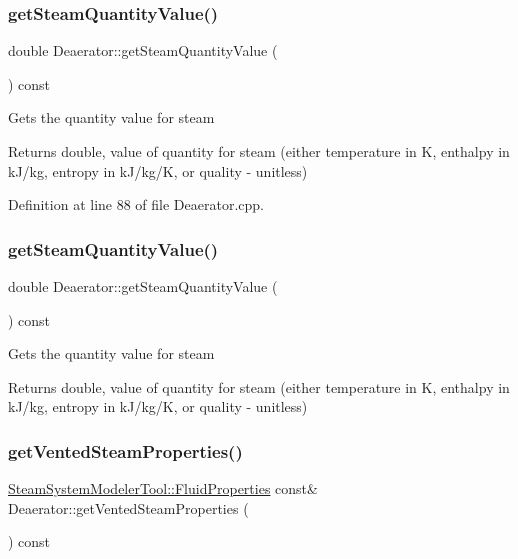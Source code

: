 \subsubsection{\texorpdfstring{get\+Steam\+Quantity\+Value()}{getSteamQuantityValue()}\hspace{0.1cm}{\footnotesize\ttfamily [2/3]}}
{\footnotesize\ttfamily double Deaerator\+::get\+Steam\+Quantity\+Value (\begin{DoxyParamCaption}{ }\end{DoxyParamCaption}) const}

Gets the quantity value for steam \begin{DoxyReturn}{Returns}
double, value of quantity for steam (either temperature in K, enthalpy in k\+J/kg, entropy in k\+J/kg/K, or quality -\/ unitless) 
\end{DoxyReturn}


Definition at line 88 of file Deaerator.\+cpp.

\mbox{\label{class_deaerator_a5473feedca64e7c44143d422ed3e2401}} 
\subsubsection{\texorpdfstring{get\+Steam\+Quantity\+Value()}{getSteamQuantityValue()}\hspace{0.1cm}{\footnotesize\ttfamily [3/3]}}
{\footnotesize\ttfamily double Deaerator\+::get\+Steam\+Quantity\+Value (\begin{DoxyParamCaption}{ }\end{DoxyParamCaption}) const}

Gets the quantity value for steam \begin{DoxyReturn}{Returns}
double, value of quantity for steam (either temperature in K, enthalpy in k\+J/kg, entropy in k\+J/kg/K, or quality -\/ unitless) 
\end{DoxyReturn}
\mbox{\label{class_deaerator_a576a4632452268f77839334d87d5abff}} 
\subsubsection{\texorpdfstring{get\+Vented\+Steam\+Properties()}{getVentedSteamProperties()}\hspace{0.1cm}{\footnotesize\ttfamily [1/3]}}
{\footnotesize\ttfamily \hyperlink{struct_steam_system_modeler_tool_1_1_fluid_properties}{Steam\+System\+Modeler\+Tool\+::\+Fluid\+Properties} const\& Deaerator\+::get\+Vented\+Steam\+Properties (\begin{DoxyParamCaption}{ }\end{DoxyParamCaption}) const\hspace{0.3cm}{\ttfamily [inline]}}

